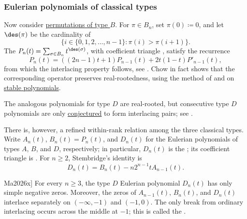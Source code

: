\subsubsection[classicalTypeEulerianRealRooted]{Eulerian polynomials of classical types}

\begin{example*}\label{ex:typeBEulerianSturm}

Now consider \hyperref[permutationsTypeB]{permutations of type $B$}.
For \(\pi\in B_n\), set \(\pi(0)\coloneqq 0\), and let \(\des(\pi)\) be the cardinality of
\[
 \{ i \in \{0,1,2,\dotsc,n-1\} : \pi(i) \gt \pi(i+1) \}.
\]
The \label{typeBEulerianPolynomial}
\(P_n(t)=\sum_{\sigma \in B_n} t^{\des(\sigma)}\), with coefficient triangle
, satisfy the recurrence
\begin{equation}
 P_n(t) = ((2n-1)t+1) P_{n-1}(t) + 2t(1-t) P'_{n-1}(t),
\end{equation}
from which the interlacing property follows, see \cite{Chow2022}.
Chow in fact shows that the corresponding operator preserves
real-rootedness, using the method of  and
 on \hyperref[stablePolynomial]{stable polynomials}.

The analogous polynomials for type \(D\) are real-rooted, but consecutive
type \(D\) polynomials are only
\hyperref[conjTypeDEulerianInterlacing]{conjectured} to form interlacing
pairs; see \cite[Section~5]{Chow2022}.

There is, however, a refined within-rank relation among the three classical
types.  Write $A_n(t)$, $B_n(t)=P_n(t)$, and $D_n(t)$ for the Eulerian
polynomials of types $A$, $B$, and $D$, respectively; in particular,
$D_n(t)$ is the 
\label{typeDEulerianPolynomial}; its coefficient triangle is
.  For $n\geq 2$, Stembridge's identity is
\[
  D_n(t)=B_n(t)-n2^{n-1}tA_{n-1}(t).
\]

\begin{theorem}[Ma, \cite[Thm.~1]{Ma2026x}]
\label{halfInterlacingEulerian}
For every $n\geq 3$, the type $D$ Eulerian polynomial $D_n(t)$ has only
simple negative zeros.  Moreover, the zeros of $A_{n-1}(t)$, $B_n(t)$, and
$D_n(t)$ interlace separately on $(-\infty,-1)$ and $(-1,0)$.  The only
break from ordinary interlacing occurs across the middle at $-1$; this is
called the .
\end{theorem}


\end{example*}

